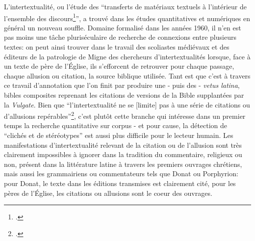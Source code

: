 L'intertextualité, ou l'étude des \enquote{transferts de matériaux textuels à l'intérieur de l'ensemble des discours\footcite{aron_intertextualite_2010}}, a trouvé dans les études quantitatives et numériques en général un nouveau souffle. Domaine formalisé dans les années 1960, il n'en est pas moins une tâche pluriséculaire de recherche de connexions entre plusieurs textes: on peut ainsi trouver dans le travail des scoliastes médiévaux et des éditeurs de la patrologie de Migne des chercheurs d'intertextualités lorsque, face à un texte de père de l'Église, ils s'efforcent de retrouver pour chaque passage, chaque allusion ou citation, la source biblique utilisée. Tant est que c'est à travers ce travail d'annotation que l'on finit par produire une - puis des - \textit{vetus latina}, bibles composites reprenant les citations de versions de la Bible supplantées par la \textit{Vulgate}. Bien que \enquote{l'intertextualité ne se [limite] pas à une série de citations ou d'allusions repérables}\footcite{aron_intertextualite_2010}, c'est plutôt cette branche qui intéresse dans un premier temps la recherche quantitative sur corpus - et pour cause, la détection de \enquote{clichés et de stéréotypes} est aussi plus difficile pour le lecteur humain. Les manifestations d'intertextualité relevant de la citation ou de l'allusion sont très clairement impossibles à ignorer dans la tradition du commentaire, religieux ou non, présent dans la littérature latine à travers les premiers ouvrages chrétiens, mais aussi les grammairiens ou commentateurs tels que Donat ou Porphyrion: pour Donat, le texte dans les éditions transmises est clairement cité, pour les pères de l'Église, les citations ou allusions sont le coeur des ouvrages. 

